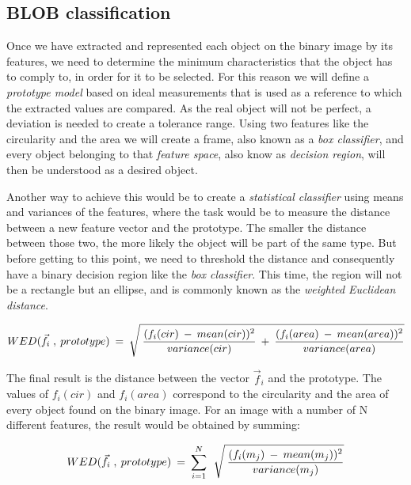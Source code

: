 
\subsection{BLOB classification}
Once we have extracted and represented each object on the binary image by its features, we need to determine the minimum characteristics that the object has to comply to, in order for it to be selected.
For this reason we will define a \textit{prototype model} based on ideal measurements that is used as a reference to which the extracted values are compared. As the real object will not be perfect, a deviation is needed to create a tolerance range.
Using two features like the circularity and the area we will create a frame, also known as a \textit{box classifier}, and every object belonging to that \textit{feature space}, also know as \textit{decision region}, will then be understood as a desired object.

Another way to achieve this would be to create a \textit{statistical classifier} using means and variances of the features, where the task would be to measure the distance between a new feature vector and the prototype. The smaller the distance between those two, the more likely the object will be part of the same type. But before getting to this point, we need to threshold the distance and consequently have a binary decision region like the \textit{box classifier}.
This time, the region will not be a rectangle but an ellipse, and is commonly known as the \textit{weighted Euclidean distance}.

\begin{equation}	
	\begin{aligned}
{WED(\vec{f}_{i} \; , \: prototype)} \: = \: \sqrt{\mathstrut \:  \displaystyle\frac{(f_{i}(cir) \: - \: mean(cir))^2}{variance(cir)} \: + \: \displaystyle\frac{(f_{i}(area) \: - \: mean(area))^2}{variance(area)}}
\label{Euclidean}
	\end{aligned}
\end{equation}

The final result is the distance between the vector {$\vec{f}_{i}$} and the prototype. The values of {$f_{i}(cir)$} and {$f_{i}(area)$} correspond to the circularity and the area of every object found on the binary image. For an image with a number of N different features, the result would be obtained by summing:


\begin{equation}	
	\begin{aligned}
{WED(\vec{f}_{i} \; , \: prototype)} \: = \: \displaystyle\sum_{i=1}^N \: \: \sqrt{\mathstrut \:  \displaystyle\frac{(f_{i}(m_{j}) \: - \: mean(m_{j}))^2}{variance(m_{j})}}
\label{Euclidean1}
	\end{aligned}
\end{equation}

